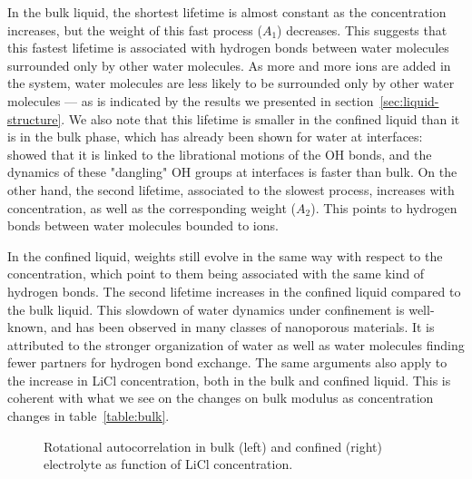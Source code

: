 \documentclass[thesis]{subfiles}
\begin{document}
In the bulk liquid, the shortest lifetime is almost constant as the
concentration increases, but the weight of this fast process ($A_1$) decreases.
This suggests that this fastest lifetime is associated with hydrogen bonds
between water molecules surrounded only by other water molecules. As more and
more ions are added in the system, water molecules are less likely to be
surrounded only by other water molecules --- as is indicated by the results we
presented in section~\ref{sec:liquid-structure}. We also note that this
lifetime is smaller in the confined liquid than it is in the bulk phase, which
has already been shown for water at interfaces:
\citeauthor{Fogarty2014}\cite{Fogarty2014} showed that it is linked to the
librational motions of the OH bonds, and the dynamics of these "dangling" OH
groups at interfaces is faster than bulk\cite{Scatena2001}. On the other hand,
the second lifetime, associated to the slowest process, increases with
concentration, as well as the corresponding weight ($A_2$). This points to
hydrogen bonds between water molecules bounded to ions.

In the confined liquid, weights still evolve in the same way with respect to the
concentration, which point to them being associated with the same kind of
hydrogen bonds. The second lifetime increases in the confined liquid compared to
the bulk liquid. This slowdown of water dynamics under confinement is
well-known\cite{Fogarty2014}, and has been observed in many classes of
nanoporous materials\cite{Jeffery2004, RomeroVargasCastrillon2009, Haigis2013,
Scalfi2018}. It is attributed to the stronger organization of water as well as
water molecules finding fewer partners for hydrogen bond exchange. The same
arguments also apply to the increase in LiCl concentration, both in the bulk and
confined liquid. This is coherent with what we see on the changes on bulk
modulus as concentration changes in table~\ref{table:bulk}.

\begin{figure}[ht]
    \centering
    
    \caption{Rotational autocorrelation in bulk (left) and confined (right)
    electrolyte as function of LiCl concentration.}
    \label{fig:licl-zif:rotcf}
\end{figure}
\end{document}
